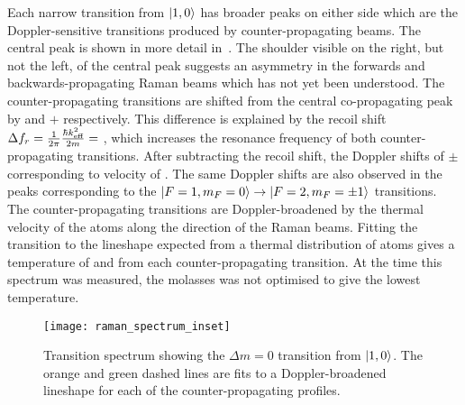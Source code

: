 \par\noindent
Each narrow transition from \(\ket{1,0}\) has broader
peaks on either side which are the Doppler-sensitive transitions
produced by counter-propagating beams.
The central peak is shown in more detail
in~. The shoulder visible on the
right, but not the left, of the central peak suggests an asymmetry in
the forwards and backwards-propagating Raman beams which has not yet
been understood. The counter-propagating
transitions are shifted from the central co-propagating peak by  and
\(+\) respectively. This difference is
explained by the recoil shift $\Delta f_r = \frac{1}{2\pi}\frac{\hbar
k^2_\textnormal{eff}}{2m} = $ , which increases
the resonance frequency of both counter-propagating transitions.
After subtracting the recoil shift, the Doppler shifts of
$\pm$ corresponding to
velocity of . The same Doppler shifts are also
observed in the peaks corresponding to the \(\ket{F=1,m_F = 0}
\rightarrow \ket{F=2,m_F=\pm 1}\) transitions. The counter-propagating transitions are
Doppler-broadened by the thermal velocity of the atoms along the direction
of the Raman beams. 
Fitting the transition to the lineshape expected
from a thermal distribution of atoms gives a temperature of
 and  from
each counter-propagating transition. At the time this spectrum was
measured, the molasses was not optimised to give the lowest
temperature. 
\begin{figure}[htpb!]
  \centering
  \texttt{[image: raman\_spectrum\_inset]}
  \caption[\(\Delta m = 0\) transition spectrum.]{Transition spectrum showing the \(\Delta m = 0\) transition
  from \(\ket{1,0}\). The orange and green dashed lines are fits to a
Doppler-broadened lineshape for each of the counter-propagating
profiles.}
  \label{fig:raman_spectrum_inset}
\end{figure}

